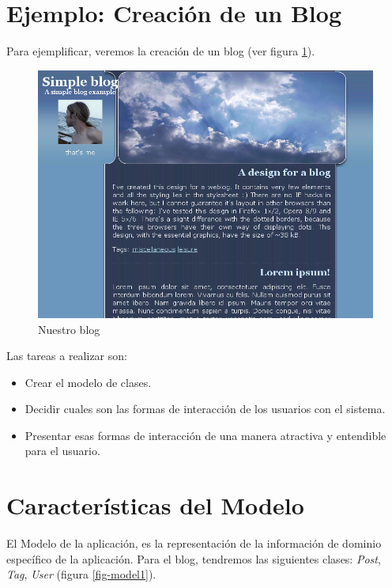 \section{Ejemplo: Creación de un Blog}
Para ejemplificar, veremos la creación de un blog (ver figura \ref{fig-blog1}).

\begin{figure}[h]
	\centering
	\includegraphics[scale=0.7]{images/blog1.png}
 	\caption{Nuestro blog}
 	\label{fig-blog1}
\end{figure}

Las tareas a realizar son:
\begin{itemize}
\item Crear el modelo de clases.
\item Decidir cuales son las formas de interacción de los usuarios con el sistema.
\item Presentar esas formas de interacción de una manera atractiva y entendible para el usuario.
\end{itemize}

\section{Características del Modelo}

El Modelo de la aplicación, es la representación de la información de dominio específico de la aplicación. Para el blog, tendremos las siguientes clases: \emph{Post}, \emph{Tag}, \emph{User} (figura \ref{fig-model1}).

